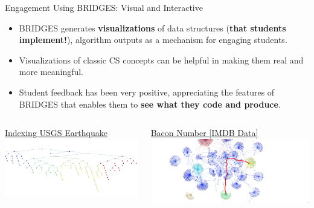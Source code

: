 \documentclass[aspectratio=169]{beamer}
\begin{document}
\begin{frame}{Engagement Using BRIDGES: Visual and Interactive}
\begin{itemize}
	\item BRIDGES generates \textbf{visualizations} of data structures 
	(\textbf{that students implement!}), algorithm outputs
		as a mechanism for engaging students.
	\item Visualizations of classic CS concepts can be helpful in making
		them real and more meaningful. 
	\item Student feedback has been very positive, appreciating the features
		of BRIDGES that enables them to \textbf{see what they code and produce}.
\end{itemize}
  \begin{columns}
    \begin{column}{.47\linewidth}
      \begin{block}{\href{http://bridges-cs.herokuapp.com/assignments/137/kalpathi60}{\underline{Indexing USGS Earthquake}}}
        \includegraphics[width=\linewidth]{figs/BSTEq.png}
      \end{block}
    \end{column}
    \begin{column}{.47\linewidth}
      \begin{block}{\href{http://bridges-cs.herokuapp.com/assignments/1002/bridges_public}{\underline{Bacon Number [IMDB Data]}}}
        \includegraphics[width=\linewidth]{figs/BaconNumber.png}
      \end{block}
    \end{column}
  \end{columns}  
\end{frame}
\end{document}
